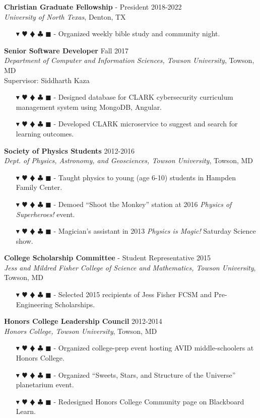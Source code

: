\documentclass[overlapped, 10pt]{res} %
\newcommand{\physics}{$\blacktriangledown$}
\newcommand{\biochem}{$\varheartsuit$}
\newcommand{\shannon}{$\vardiamondsuit$}
\newcommand{\classic}{$\clubsuit$}
\newcommand{\quantum}{$\blacksquare$}
\newcommand{\physicscolor}{\color{YellowOrange}}
\newcommand{\biochemcolor}{\color{Emerald}}
\newcommand{\shannoncolor}{\color{Goldenrod}}
\newcommand{\classiccolor}{\color{Cyan}}
\newcommand{\quantumcolor}{\color{RedOrange}}
\newcommand{\tag}[1]{
    {\IfSubStr{#1}{\physics}{\physicscolor}{\color{White}}\physics}
    {\IfSubStr{#1}{\biochem}{\biochemcolor}{\color{White}}\biochem}
    {\IfSubStr{#1}{\shannon}{\shannoncolor}{\color{White}}\shannon}
    {\IfSubStr{#1}{\classic}{\classiccolor}{\color{White}}\classic}
    {\IfSubStr{#1}{\quantum}{\quantumcolor}{\color{White}}\quantum}
}
\begin{document}
\begin{resume}
\textbf{Christian Graduate Fellowship} - President \hfill 2018-2022 \\
\textit{University of North Texas}, Denton, TX
\begin{itemize} \itemsep -2pt %
\item[\tag{}-] Organized weekly bible study and community night.
\end{itemize}

\textbf{Senior Software Developer} \hfill Fall 2017 \\
\textit{Department of Computer and Information Sciences, Towson University}, Towson, MD \\
Supervisor: Siddharth Kaza
\begin{itemize} \itemsep -2pt %
\item[\tag{\classic}-] Designed database for CLARK cybersecurity curriculum management system using MongoDB, Angular.
\item[\tag{\classic}-] Developed CLARK microservice to suggest and search for learning outcomes.
\end{itemize}

\textbf{Society of Physics Students} \hfill 2012-2016 \\
\textit{Dept. of Physics, Astronomy, and Geosciences, Towson University}, Towson, MD
\begin{itemize} \itemsep -2pt %
\item[\tag{\physics}-] Taught physics to young (age 6-10) students in Hampden Family Center.
\item[\tag{\physics}-] Demoed ``Shoot the Monkey'' station at 2016 \textit{Physics of Superheroes!} event.
\item[\tag{\physics}-] Magician's assistant in 2013 \textit{Physics is Magic!} Saturday Science show.
\end{itemize}

\textbf{College Scholarship Committee} - Student Representative \hfill 2015 \\
\textit{Jess and Mildred Fisher College of Science and Mathematics, Towson University}, Towson, MD
\begin{itemize} \itemsep -2pt %
\item[\tag{}-] Selected 2015 recipients of Jess Fisher FCSM and Pre-Engineering Scholarships.
\end{itemize}

\textbf{Honors College Leadership Council} \hfill 2012-2014 \\
\textit{Honors College, Towson University}, Towson, MD
\begin{itemize} \itemsep -2pt %
\item[\tag{}-] Organized college-prep event hosting AVID middle-schoolers at Honors College.
\item[\tag{}-] Organized ``Sweets, Stars, and Structure of the Universe'' planetarium event.
\item[\tag{}-] Redesigned Honors College Community page on Blackboard Learn.
\end{itemize}


\end{resume}
\end{document}
